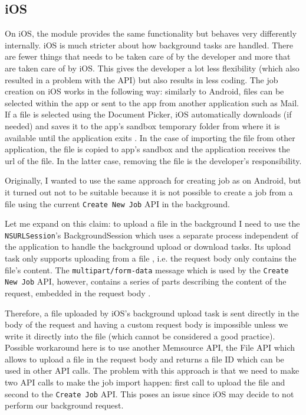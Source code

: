 \subsection{iOS}
On iOS, the module provides the same functionality but behaves very differently internally. iOS is much stricter about how background tasks are handled. There are fewer things that needs to be taken care of by the developer and more that are taken care of by iOS. This gives the developer a lot less flexibility (which also resulted in a problem with the API) but also results in less coding. The job creation on iOS works in the following way: similarly to Android, files can be selected within the app or sent to the app from another application such as Mail. If a file is selected using the Document Picker, iOS automatically downloads (if needed) and saves it to the app’s sandbox temporary folder from where it is available until the application exits \cite{ios:filePicker}. In the case of importing the file from other application, the file is copied to app's sandbox and the application receives the url of the file. In the latter case, removing the file is the developer's responsibility.

Originally, I wanted to use the same approach for creating job as on Android, but it turned out not to be suitable because it is not possible to create a job from a file using the current \texttt{Create New Job} API in the background. 

Let me expand on this claim: to upload a file in the background I need to use the \texttt{NSURLSession}'s BackgroundSession which uses a separate process \cite{ios:bgConsiderations} independent of the application to handle the background upload or download tasks. Its upload task only supports uploading from a file \cite{ios:bgConsiderations}, i.e. the request body only contains the file's content. The \texttt{multipart/form-data} message which is used by the \texttt{Create New Job} API, however, contains a series of parts describing the content of the request, embedded in the request body \cite{rfc2388}.  

Therefore, a file uploaded by iOS's background upload task is sent directly in the body of the request and having a custom request body is impossible unless we write it directly into the file (which cannot be considered a good practice). Possible workaround here is to use another Memsource API, the File API which allows to upload a file in the request body and returns a file ID which can be used in other API calls. The problem with this approach is that we need to make two API calls to make the job import happen: first call to upload the file and second to the \texttt{Create Job} API. This poses an issue since iOS may decide to not perform our background request.

